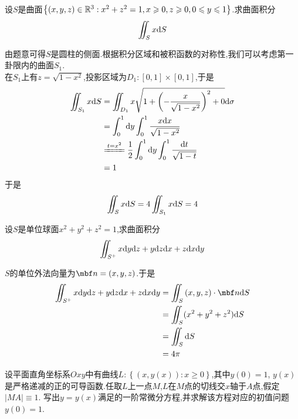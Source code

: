 \documentclass{ctexart}
\begin{document}
\begin{problem}[5.(10\songti{分})]
    设$S$是曲面$\left\{(x,y,z)\in\mathbb{R}^3:x^2+z^2=1,x\geqslant 0,z\geqslant 0,0\leqslant y\leqslant 1\right\}$.求曲面积分
    \[\iint_Sx\mathrm{d} S\]

\end{problem}
\begin{solution}
    由题意可得$S$是圆柱的侧面.根据积分区域和被积函数的对称性,我们可以考虑第一卦限内的曲面$S_1$.\\
    在$S_1$上有$z=\sqrt{1-x^2}$,投影区域为$D_1:[0,1]\times[0,1]$,于是
    \[\begin{aligned}
        \iint_{S_1}x\di S
        &= \iint_{D_1}x\sqrt{1+\left(-\dfrac{x}{\sqrt{1-x^2}}\right)^2+0}\di\sigma \\
        &= \int_0^1\di y\int_0^1\dfrac{x\di x}{\sqrt{1-x^2}} \\
        &\xlongequal{t=x^2} \dfrac12\int_0^1\di y\int_0^1\dfrac{\di t}{\sqrt{1-t}} \\
        &= 1
    \end{aligned}\]
    于是
    \[\iint_Sx\mathrm{d} S=4\iint_{S_1}x\mathrm{d} S=4\]
\end{solution}
\begin{problem}[6.(10\songti{分})]
    设$S$是单位球面$x^2+y^2+z^2=1$,求曲面积分
    \[\iint_{S^+}x\mathrm{d} y\mathrm{d} z+y\mathrm{d} z\mathrm{d} x+z\mathrm{d} x\mathrm{d} y\]

\end{problem}
\begin{solution}
    $S$的单位外法向量为$\mbf n=(x,y,z)$.于是
    \[\begin{aligned}
        \iint_{S^+}x\di y\di z+y\di z\di x+z\di x\di y
        &= \iint_S\left(x,y,z\right)\cdot\mbf n\di S \\
        &= \iint_S(x^2+y^2+z^2)\di S \\
        &= \iint_S\di S \\
        &= 4\pi
    \end{aligned}\]
\end{solution}
\begin{problem}[7.(15\songti{分})]
    设平面直角坐标系$Oxy$中有曲线$L:\left\{(x,y(x)):x\geqslant0\right\}$,其中$y(0)=1$,%
    $y(x)$是严格递减的正的可导函数.任取$L$上一点$M$,$L$在$M$点的切线交$x$轴于$A$点,假定$\left|MA\right|\equiv1$.%
    写出$y=y(x)$满足的一阶常微分方程,并求解该方程对应的初值问题$y(0)=1$.
\end{problem}
\end{document}
